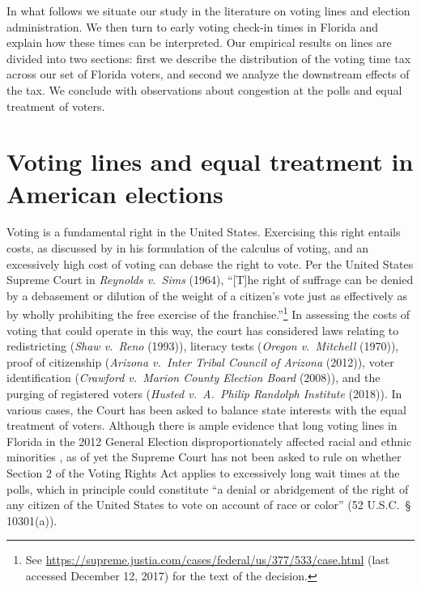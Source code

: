 \documentclass[12pt,titlepage]{article}
\begin{document}



In what follows we situate our study in the literature on voting lines
and election administration. We then turn to early voting check-in
times in Florida and explain how these times can be interpreted. Our
empirical results on lines are divided into two sections: first we
describe the distribution of the voting time tax across our set of
Florida voters, and second we analyze the downstream effects of the
tax. We conclude with observations about congestion at the polls and
equal treatment of voters.

\section*{Voting lines and equal treatment in American elections}

Voting is a fundamental right in the United States. Exercising this
right entails costs, as discussed by \cite{downs:econtheory} in his
formulation of the calculus of voting, and an excessively high cost of
voting can debase the right to vote. Per the United States Supreme
Court in \emph{Reynolds v.\ Sims} (1964), ``[T]he right of suffrage
can be denied by a debasement or dilution of the weight of a citizen's
vote just as effectively as by wholly prohibiting the free exercise of
the franchise.''\footnote{See
  \url{https://supreme.justia.com/cases/federal/us/377/533/case.html}
  (last accessed December 12, 2017) for the text of the decision.} In
assessing the costs of voting that could operate in this way, the
court has considered laws relating to redistricting (\emph{Shaw v.\
  Reno} (1993)), literacy tests (\emph{Oregon v.\
  Mitchell} (1970)), proof of citizenship (\emph{Arizona v.\ Inter
  Tribal Council of Arizona} (2012)), voter identification
(\emph{Crawford v.\ Marion County
  Election Board} (2008)), and the purging of registered voters
(\emph{Husted v.\ A.\ Philip Randolph Institute} (2018)). In various
cases, the Court has been asked to balance state interests with the
equal treatment of voters.  Although there is ample evidence that long
voting lines in Florida in the 2012 General Election
disproportionately affected racial and ethnic minorities
\citep{herron_smith2014}, as of yet the Supreme Court has not been
asked to rule on whether Section 2 of the Voting Rights Act applies to
excessively long wait times at the polls, which in principle could
constitute ``a denial or abridgement of the right of any citizen of
the United States to vote on account of race or color'' (52 U.S.C.\ \S
10301(a)).
\end{document}
